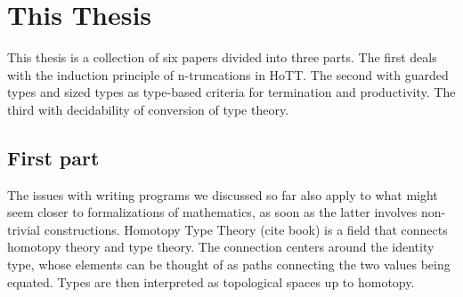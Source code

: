 \documentclass{book}
\begin{document}
\section{This Thesis}

This thesis is a collection of six papers divided into three parts.
The first deals with the induction principle of n-truncations in HoTT.
The second with guarded types and sized types as type-based criteria
for termination and productivity. The third with decidability of
conversion of type theory.

\subsection{First part}
The issues with writing programs we discussed so far also apply to
what might seem closer to formalizations of mathematics, as soon as the
latter involves non-trivial constructions.
Homotopy Type Theory (cite book) is a field that connects homotopy theory and type theory.
The connection centers around the identity type, whose elements can be
thought of as paths connecting the two values being equated. Types are
then interpreted as topological spaces up to homotopy.
\end{document}
